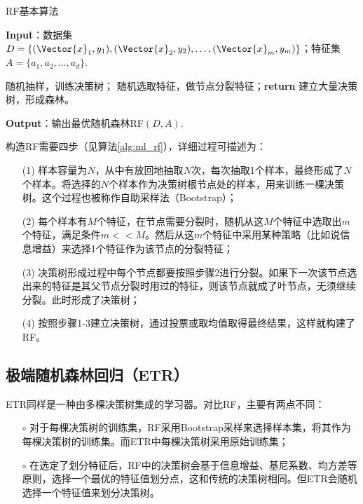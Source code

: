 \begin{algorithm}[!htbp]
  \small
  \caption{RF基本算法}\label{alg:ml_rf}
  \textbf{Input}：{数据集$D=\{(\Vector{x}_1,y_1),(\Vector{x}_2,y_2),\ldots,(\Vector{x}_m,y_m)\}$；特征集$A=\{a_1,a_2,\ldots,a_d\}$.}
  \begin{algorithmic}[1]
    \State 随机抽样，训练决策树；
      \State 随机选取特征，做节点分裂特征；\textbf{return}
    \EndWhile
    \State 建立大量决策树，形成森林。
    \EndProcedure
  \end{algorithmic}
  \textbf{Output}：{输出最优随机森林RF$(D,A)$.}
\end{algorithm}

构造RF需要四步（见算法\ref{alg:ml_rf}），详细过程可描述为：
\begin{enumerate}
  \item[(1)] 样本容量为$N$，从中有放回地抽取$N$次，每次抽取1个样本，最终形成了$N$个样本。将选择的$N$个样本作为决策树根节点处的样本，用来训练一棵决策树。这个过程也被称作自助采样法（Bootstrap）；
  \item[(2)] 每个样本有$M$个特征，在节点需要分裂时，随机从这$M$个特征中选取出$m$个特征，满足条件$m<<M$。然后从这$m$个特征中采用某种策略（比如说信息增益）来选择1个特征作为该节点的分裂特征；
  \item[(3)] 决策树形成过程中每个节点都要按照步骤2进行分裂。如果下一次该节点选出来的特征是其父节点分裂时用过的特征，则该节点就成了叶节点，无须继续分裂。此时形成了决策树；
  \item[(4)] 按照步骤1-3建立决策树，通过投票或取均值取得最终结果，这样就构建了RF。
\end{enumerate}

\subsection{极端随机森林回归（ETR）}\label{sec:ml_etr}

ETR同样是一种由多棵决策树集成的学习器。对比RF，主要有两点不同：
\begin{enumerate}
  \item[$\circ$] 对于每棵决策树的训练集，RF采用Bootstrap采样来选择样本集，将其作为每棵决策树的训练集。而ETR中每棵决策树采用原始训练集；
  \item[$\circ$] 在选定了划分特征后，RF中的决策树会基于信息增益、基尼系数、均方差等原则，选择一个最优的特征值划分点，这和传统的决策树相同。但ETR会随机选择一个特征值来划分决策树。
\end{enumerate}

